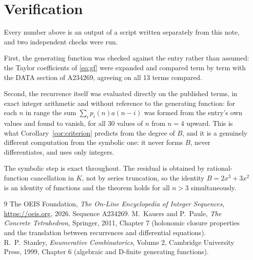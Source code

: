\documentclass[11pt,a4paper]{article}
\theoremstyle{plain}
\theoremstyle{definition}
\begin{document}
\section{Verification}

Every number above is an output of a script written separately from this note, and two
independent checks were run.

First, the generating function was checked against the entry rather than assumed: the
Taylor coefficients of \eqref{eq:gf} were expanded and compared term by term with the DATA
section of A234269, agreeing on all 13 terms compared.

Second, the recurrence itself was evaluated directly on the published terms, in exact
integer arithmetic and without reference to the generating function: for each $n$ in range
the sum $\sum_{i}p_{i}(n)a(n-i)$ was formed from the entry's own values and found to
vanish, for all 30 values of $n$ from $n=4$ upward. This is what
Corollary~\ref{cor:criterion} predicts from the degree of $B$, and it is a genuinely
different computation from the symbolic one: it never forms $B$, never differentiates, and
uses only integers.

The symbolic step is exact throughout. The residual is obtained by rational-function
cancellation in $K$, not by series truncation, so the identity $B=2 x^{3} + 3 x^{2}$ is an
identity of functions and the theorem holds for all $n>3$ simultaneously.

\begin{thebibliography}{9}
 The OEIS Foundation, \emph{The On-Line Encyclopedia of Integer Sequences},
\url{https://oeis.org}, 2026. Sequence A234269.
 M.~Kauers and P.~Paule, \emph{The Concrete Tetrahedron}, Springer, 2011,
Chapter 7 (holonomic closure properties and the translation between recurrences and
differential equations).
 R.~P.~Stanley, \emph{Enumerative Combinatorics}, Volume 2, Cambridge
University Press, 1999, Chapter 6 (algebraic and D-finite generating functions).
\end{thebibliography}
\end{document}
